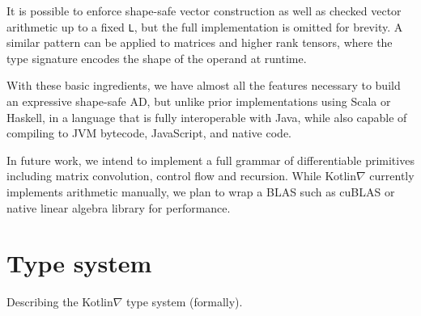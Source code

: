 \documentclass[12pt,initial,twoside,maitrise]{dms}
\numberwithin{equation}{section}
\numberwithin{table}{chapter}
\numberwithin{figure}{chapter}
\begin{document}
It is possible to enforce shape-safe vector construction as well as checked vector arithmetic up to a fixed \texttt{L}, but the full implementation is omitted for brevity. A similar pattern can be applied to matrices and higher rank tensors, where the type signature encodes the shape of the operand at runtime.

With these basic ingredients, we have almost all the features necessary to build an expressive shape-safe AD, but unlike prior implementations using Scala or Haskell, in a language that is fully interoperable with Java, while also capable of compiling to JVM bytecode, JavaScript, and native code.

In future work, we intend to implement a full grammar of differentiable primitives including matrix convolution, control flow and recursion. While Kotlin$\nabla$ currently implements arithmetic manually, we plan to wrap a BLAS such as cuBLAS or native linear algebra library for performance.

\section{Type system}\label{sec:type-system}

Describing the Kotlin$\nabla$ type system (formally).
\end{document}
